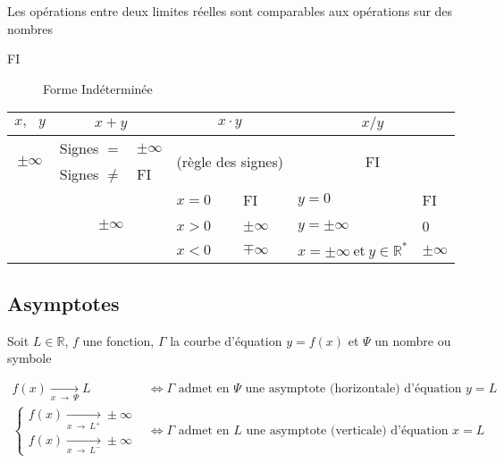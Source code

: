 \documentclass{article}
\newcommand{\R}{\mathds{R}}
\newcommand{\oo}{\infty}
\newcommand{\twoRows}[1]{\multirow{2}{*}{#1}}
\newcommand{\threeRows}[1]{\multirow{3}{*}{#1}}
\newcommand{\twoCols}[1]{\multicolumn{2}{c|}{#1}}
\newcommand{\twoColsNB}[1]{\multicolumn{2}{c}{#1}}
\newcommand{\goesto}[2]{\xrightarrow[#1\:\to\:#2]{}}
\newcommand{\et}{\:\text{et}\:}
\begin{document}
Les opérations entre deux limites réelles sont comparables aux opérations sur des nombres
\begin{description}
\item[FI] Forme Indéterminée
\end{description}

\begin{table}[H]
\centering
\begin{tabular}{c||ll|ll|ll}

$x,\:\:\: y$                             & \multicolumn{2}{c}{$x+y$}     & \multicolumn{2}{c}{$x\cdot y$}           & \multicolumn{2}{c}{$x/y$}              \\
\hline\hline
\twoRows{$\pm\oo$}                       & Signes $=$     & $\pm\oo$     & \twoCols{\twoRows{(règle des signes)}}   & \twoColsNB{\twoRows{FI}}               \\
                                         & Signes $\not=$ & FI           &                                          &                                   \\
\hline
\twoRows{\threeRows{$\R$ ou $\pm\oo$}}   & \twoCols{\threeRows{$\pm\oo$}}& $x = 0$          & FI                    & $y = 0$       & FI                     \\
                                         &                               && $x > 0$          & $\pm\oo$              & $y= \pm\oo$   & 0                      \\
                                         &                               && $x < 0$          & $\mp\oo$              & $x = \pm\oo \et y \in \R^\ast$  & $\pm\oo$               \\

\end{tabular}
\end{table}

\subsection{Asymptotes}

Soit $L \in \R$, $f$ une fonction, $\Gamma$ la courbe d'équation $y = f(x)$ et $\Psi$ un nombre ou symbole

\begin{equation*}
    \begin{split}
        f(x) \goesto{x}{\Psi} L &\iff \text{$\Gamma$ admet en $\Psi$ une asymptote (horizontale) d'équation $y = L$}\\
        \begin{cases}
            f(x) \goesto{x}{L^+} \pm\oo\\
            f(x) \goesto{x}{L^-} \pm\oo
        \end{cases} &\iff \text{$\Gamma$ admet en $L$ une asymptote (verticale) d'équation $x = L$}
    \end{split}
\end{equation*}
\end{document}
